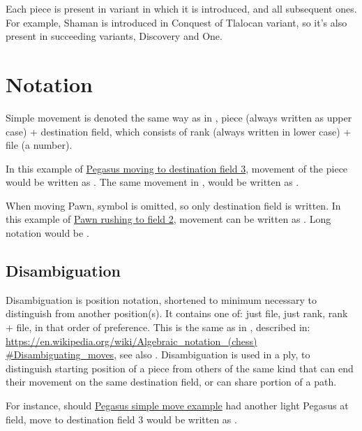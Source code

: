 Each piece is present in variant in which it is introduced, and all subsequent ones.
For example, Shaman is introduced in Conquest of Tlalocan variant, so it's also present
in succeeding variants, Discovery and One.

\clearpage %

\section*{Notation}
\label{sec:Appendix/Notation}

Simple movement is denoted the same way as in , piece (always written as upper
case) + destination field, which consists of rank (always written in lower case) + file
(a number).

In this example of \hyperref[fig:scn_ct_03_define_step_ply]{Pegasus moving to destination
field 3}, movement of the piece would be written as . The same movement in
, would be written as .

When moving Pawn, symbol is omitted, so only destination field is written. In this example
of \hyperref[fig:04_croatian_ties_en_passant]{Pawn rushing to field 2}, movement can be
written as . Long notation would be .

\subsection*{Disambiguation}
\label{sec:Appendix/Notation/Disambiguation}

Disambiguation is position notation, shortened to minimum necessary to distinguish from
another position(s). It contains one of: just file, just rank, rank + file, in that order
of preference. This is the same as in , described in:\newline
\href{https://en.wikipedia.org/wiki/Algebraic\_notation\_(chess)\#Disambiguating\_moves}{https://en.wikipedia.org/wiki/Algebraic\_notation\_(chess)\newline
\#Disambiguating\_moves}, see also .
Disambiguation is used in a ply, to distinguish starting position of a piece from others
of the same kind that can end their movement on the same destination field, or can share
portion of a path.

For instance, should \hyperref[fig:scn_ct_03_define_step_ply]{Pegasus simple move example}
had another light Pegasus at  field, move to destination field 3 would be written
as .

